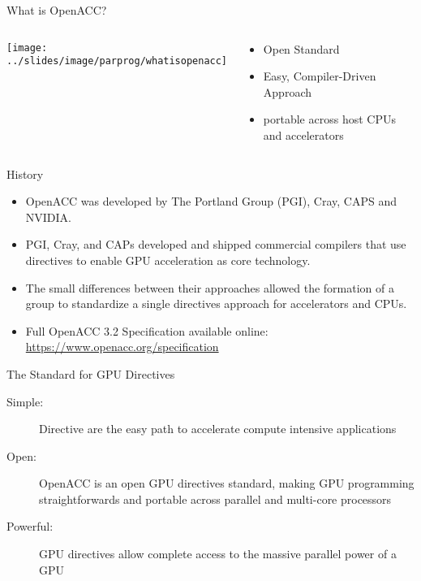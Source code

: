\documentclass[10pt,t]{beamer}
\begin{document}
\begin{frame}[allowframebreaks]{What is OpenACC?}
  \begin{columns}
  \begin{center}
    \texttt{[image: ../slides/image/parprog/whatisopenacc]}
  \end{center}
  \begin{block}{}
    \begin{itemize}
      \item Open Standard
      \item Easy, Compiler-Driven Approach
      \item portable across host CPUs and accelerators
    \end{itemize}
  \end{block}
  \end{columns}	

  \framebreak

  \begin{exampleblock}{History}
    \begin{itemize}
    \item OpenACC was developed by The Portland Group (PGI), Cray, CAPS and NVIDIA. 
    \item PGI, Cray, and CAPs developed and shipped commercial compilers that use directives to enable GPU acceleration as core technology. 
    \item The small differences between their approaches allowed the formation of a group to standardize a single directives approach for accelerators and CPUs.
    \item Full OpenACC 3.2 Specification available online: \url{https://www.openacc.org/specification}
    \end{itemize}
  \end{exampleblock}

  \begin{exampleblock}{The Standard for GPU Directives}
    \begin{description}
      \item[Simple:] Directive are the easy path to accelerate compute intensive applications
      \item[Open:] OpenACC is an open GPU directives standard, making GPU programming straightforwards and portable across parallel and multi-core processors
      \item[Powerful:] GPU directives allow complete access to the massive parallel power of a GPU
    \end{description}
  \end{exampleblock}
\end{frame}
\end{document}
